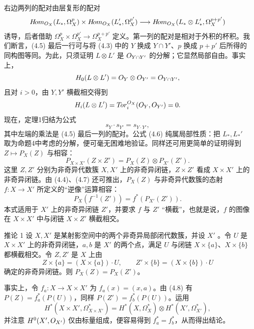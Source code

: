 右边两列的配对由层复形的配对
\[
H\!om_{O_X}(L_*,\Omega_X^p)\times
H\!om_{O_X}(L_*',\Omega_X^{p'})
\longrightarrow H\!om_{O_X}(L_*\otimes L_*',\Omega_X^{p+p'})
\]
诱导，后者借助 $\Omega_X^p\times\Omega_X^{p'}\to\Omega_X^{p+p'}$ 定义。第一列的配对是相对于外积的杯积。我们断言，(4.5) 最后一行可与将 (4.3) 中的 $Y$ 换成 $Y\cap Y'$、$p$ 换成 $p+p'$ 后所得的同构图等同。为此，只须证明 $L\otimes L'$ 是 $O_{Y\cap Y'}$ 的分解；它显然局部自由。事实上，
\[
H_0(L\otimes L')=O_Y\otimes O_{Y'}=O_{Y\cap Y'},
\]
且对 $i>0$，由 $Y,Y'$ 横截相交得到
\[
H_i(L\otimes L')=T\!or_i^{O_X}(O_Y,O_{Y'})=0.
\]
现在，定理1归结为公式
\begin{equation}
s_Y\cdot s_{Y'}=s_{Y\cdot Y'},\tag{4.6}
\end{equation}
其中左端的乘法是 (4.5) 最后一列的配对。公式 (4.6) 纯属局部性质：把 $L_*,L_*'$ 取为命题4中考虑的分解，便可毫无困难地验证。同样还可用更简单的证明得到 $Z\mapsto P_X(Z)$ 与相容：
\begin{equation}
P_{X\times X'}(Z\times Z')=P_X(Z)\otimes P_{X'}(Z').\tag{4.7}
\end{equation}
这里 $Z,Z'$ 分别为非奇异代数簇 $X,X'$ 上的非奇异闭链，$Z\times Z'$ 看成 $X\times X'$ 上的非奇异闭链。由 (4.4)、(4.7) 还可推出，$P_X(Z)$ 与非奇异代数簇的态射 $f:X\to X'$ 所定义的“逆像”运算相容：
\begin{equation}
P_X(f^{-1}(Z'))=f^*(P_{X'}(Z')).\tag{4.8}
\end{equation}
本式适用于 $X'$ 上的非奇异闭链 $Z'$，并要求 $f$ 与 $Z'$ “横截”，也就是说，$f$ 的图像在 $X\times X'$ 中与闭链 $X\times Z'$ 横截相交。

\begin{statement}{推论 1}
设 $X,X'$ 是某射影空间中的两个非奇异局部闭代数簇，并设 $X'$ 。令 $U$ 是 $X\times X'$ 上的非奇异闭链，$a,b$ 是 $X'$ 的两个点，满足 $U$ 与闭链 $X\times\{a\}$、$X\times\{b\}$ 都横截相交。令 $Z,Z'$ 是 $X$ 上由
\[
Z\times\{a\}=(X\times\{a\})\cdot U,\qquad
Z'\times\{b\}=(X\times\{b\})\cdot U
\]
确定的非奇异闭链。则 $P_X(Z)=P_X(Z')$。
\end{statement}
事实上，令 $f_a:X\to X\times X'$ 为 $f_a(x)=(x,a)$。由 (4.8) 有 $P(Z)=f_a^*(P(U))$，同样 $P(Z')=f_b^*(P(U))$。运用
\[
H^*(X\times X',\Omega_{X\times X'}^*)
=H^*(X,\Omega_X^*)\otimes H^*(X',\Omega_{X'}^*),
\]
并注意 $H^0(X',O_{X'})$ 仅由标量组成，便容易得到 $f_a^*=f_b^*$，从而得出结论。

